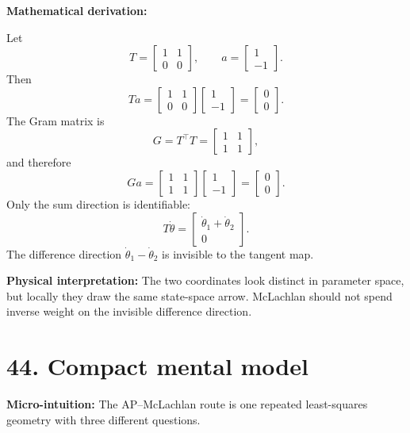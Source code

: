 \documentclass[10pt,twocolumn]{article}
\newcommand{\micro}[1]{%
  \par\smallskip
  \noindent\textcolor{deepblue}{\textbf{Micro-intuition:}} #1
  \par\smallskip}
\newcommand{\deriv}{%
  \par\noindent\textcolor{deepviolet}{\textbf{Mathematical derivation:}}\par\vspace{-1mm}}
\newcommand{\phys}[1]{%
  \par\smallskip
  \noindent\textcolor{deepgreen}{\textbf{Physical interpretation:}} #1
  \par\smallskip}
\begin{document}
\deriv
Let
\[
T=
\begin{bmatrix}
1&1\\
0&0
\end{bmatrix},
\qquad
a=
\begin{bmatrix}
1\\
-1
\end{bmatrix}.
\]
Then
\[
Ta=
\begin{bmatrix}
1&1\\
0&0
\end{bmatrix}
\begin{bmatrix}
1\\
-1
\end{bmatrix}
=
\begin{bmatrix}
0\\
0
\end{bmatrix}.
\]
The Gram matrix is
\[
G=T^\top T
=
\begin{bmatrix}
1&1\\
1&1
\end{bmatrix},
\]
and therefore
\[
Ga=
\begin{bmatrix}
1&1\\
1&1
\end{bmatrix}
\begin{bmatrix}
1\\
-1
\end{bmatrix}
=
\begin{bmatrix}
0\\
0
\end{bmatrix}.
\]
Only the sum direction is identifiable:
\[
T\dot\theta
=
\begin{bmatrix}
\dot\theta_1+\dot\theta_2\\
0
\end{bmatrix}.
\]
The difference direction \(\dot\theta_1-\dot\theta_2\) is invisible to the
tangent map.

\phys{The two coordinates look distinct in parameter space, but locally they
draw the same state-space arrow. McLachlan should not spend inverse weight on
the invisible difference direction.}

\section*{44. Compact mental model}

\micro{The AP--McLachlan route is one repeated least-squares geometry with
three different questions.}
\end{document}
